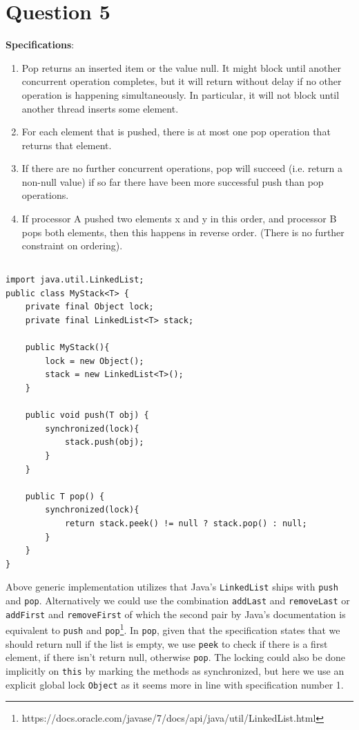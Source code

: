 \documentclass[a5paper]{article}
\begin{document}
\section{Question 5}
\textbf{Specifications}:
\begin{enumerate}
\item Pop returns an inserted item or the value null. It might block until another concurrent operation completes, but it will return without delay if no other operation is happening simultaneously. In particular, it will not block until another thread inserts some element.
\item For each element that is pushed, there is at most one pop operation that returns that element.
\item If there are no further concurrent operations, pop will succeed (i.e. return a non-null value) if so far there
have been more successful push than pop operations.
\item If processor A pushed two elements x and y in this order, and processor B pops both elements, then this
happens in reverse order. (There is no further constraint on ordering).
\end{enumerate}

\subsection{}\label{sec:mystacksimple}
\begin{lstlisting}
import java.util.LinkedList;
public class MyStack<T> {
    private final Object lock;
    private final LinkedList<T> stack;

    public MyStack(){
        lock = new Object();
        stack = new LinkedList<T>();
    }

    public void push(T obj) {
        synchronized(lock){
            stack.push(obj);
        }
    }

    public T pop() {
        synchronized(lock){
            return stack.peek() != null ? stack.pop() : null;
        }
    }
}
\end{lstlisting}

Above generic implementation utilizes that Java's \texttt{LinkedList} ships with \texttt{push} and \texttt{pop}.
Alternatively we could use the combination \texttt{addLast} and \texttt{removeLast} or \texttt{addFirst} and \texttt{removeFirst} of which the second pair by Java's documentation is equivalent to \texttt{push} and \texttt{pop}\footnote{https://docs.oracle.com/javase/7/docs/api/java/util/LinkedList.html}. 
In \texttt{pop}, given that the specification states that we should return null if the list is empty, we use \texttt{peek} to check if there is a first element, if there isn't return null, otherwise \texttt{pop}.
The locking could also be done implicitly on \texttt{this} by marking the methods as synchronized, but here we use an explicit global lock \texttt{Object} as it seems more in line with specification number 1.
\end{document}
